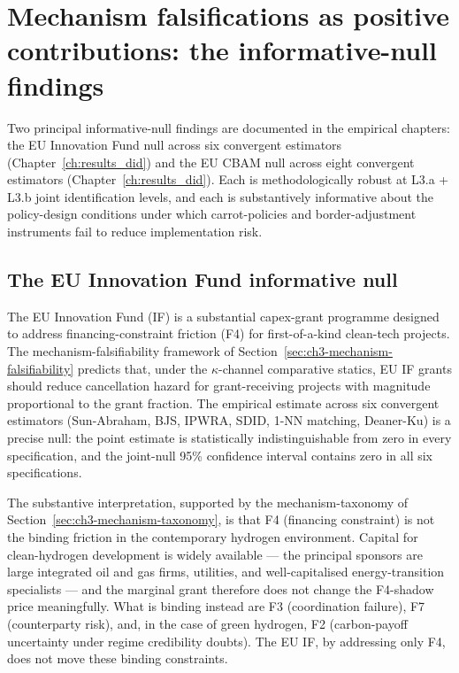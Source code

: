 \section{Mechanism falsifications as positive contributions: the informative-null findings}
\label{sec:ch10-informative-nulls}

Two principal informative-null findings are documented in the empirical chapters: the EU Innovation Fund null across six convergent estimators (Chapter~\ref{ch:results_did}) and the EU CBAM null across eight convergent estimators (Chapter~\ref{ch:results_did}). Each is methodologically robust at L3.a + L3.b joint identification levels, and each is substantively informative about the policy-design conditions under which carrot-policies and border-adjustment instruments fail to reduce implementation risk.

\subsection{The EU Innovation Fund informative null}
\label{sec:ch10-eu-if-null}

The EU Innovation Fund (IF) is a substantial capex-grant programme designed to address financing-constraint friction (F4) for first-of-a-kind clean-tech projects. The mechanism-falsifiability framework of Section~\ref{sec:ch3-mechanism-falsifiability} predicts that, under the $\kappa$-channel comparative statics, EU IF grants should reduce cancellation hazard for grant-receiving projects with magnitude proportional to the grant fraction. The empirical estimate across six convergent estimators (Sun-Abraham, BJS, IPWRA, SDID, 1-NN matching, Deaner-Ku) is a precise null: the point estimate is statistically indistinguishable from zero in every specification, and the joint-null 95\% confidence interval contains zero in all six specifications.

The substantive interpretation, supported by the mechanism-taxonomy of Section~\ref{sec:ch3-mechanism-taxonomy}, is that F4 (financing constraint) is not the binding friction in the contemporary hydrogen environment. Capital for clean-hydrogen development is widely available --- the principal sponsors are large integrated oil and gas firms, utilities, and well-capitalised energy-transition specialists --- and the marginal grant therefore does not change the F4-shadow price meaningfully. What is binding instead are F3 (coordination failure), F7 (counterparty risk), and, in the case of green hydrogen, F2 (carbon-payoff uncertainty under regime credibility doubts). The EU IF, by addressing only F4, does not move these binding constraints.

